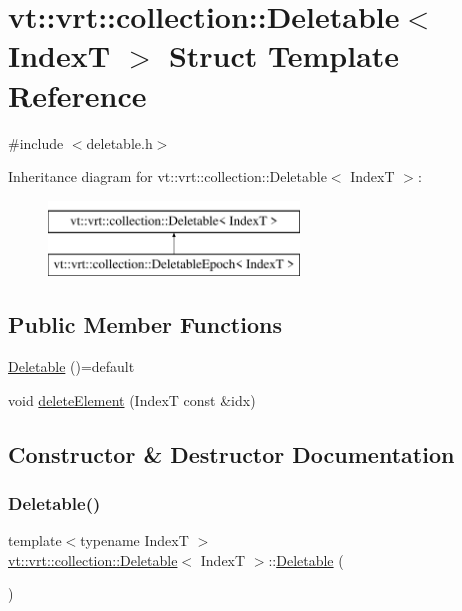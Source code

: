 \hypertarget{structvt_1_1vrt_1_1collection_1_1_deletable}{}\section{vt\+:\+:vrt\+:\+:collection\+:\+:Deletable$<$ IndexT $>$ Struct Template Reference}
\label{structvt_1_1vrt_1_1collection_1_1_deletable}


{\ttfamily \#include $<$deletable.\+h$>$}

Inheritance diagram for vt\+:\+:vrt\+:\+:collection\+:\+:Deletable$<$ IndexT $>$\+:\begin{figure}[H]
\begin{center}
\leavevmode
\includegraphics[height=2.000000cm]{structvt_1_1vrt_1_1collection_1_1_deletable}
\end{center}
\end{figure}
\subsection*{Public Member Functions}
\begin{DoxyCompactItemize}
\item 
\hyperlink{structvt_1_1vrt_1_1collection_1_1_deletable_a6c17e4dba5bb32ebff44e9d71a0aa703}{Deletable} ()=default
\item 
void \hyperlink{structvt_1_1vrt_1_1collection_1_1_deletable_a704a81052766dfc66b0c3e330a344bd5}{delete\+Element} (IndexT const \&idx)
\end{DoxyCompactItemize}


\subsection{Constructor \& Destructor Documentation}
\mbox{\label{structvt_1_1vrt_1_1collection_1_1_deletable_a6c17e4dba5bb32ebff44e9d71a0aa703}} 
\subsubsection{\texorpdfstring{Deletable()}{Deletable()}}
{\footnotesize\ttfamily template$<$typename IndexT $>$ \\
\hyperlink{structvt_1_1vrt_1_1collection_1_1_deletable}{vt\+::vrt\+::collection\+::\+Deletable}$<$ IndexT $>$\+::\hyperlink{structvt_1_1vrt_1_1collection_1_1_deletable}{Deletable} (\begin{DoxyParamCaption}{ }\end{DoxyParamCaption})\hspace{0.3cm}{\ttfamily [default]}}



